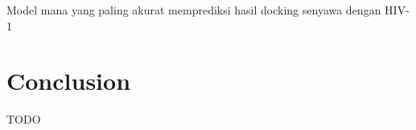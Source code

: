 \documentclass[conference,compsoc,12pt]{IEEEtran}
\begin{document}
Model mana yang paling akurat memprediksi hasil docking senyawa dengan HIV-1

\section{Conclusion}

TODO






\end{document}
